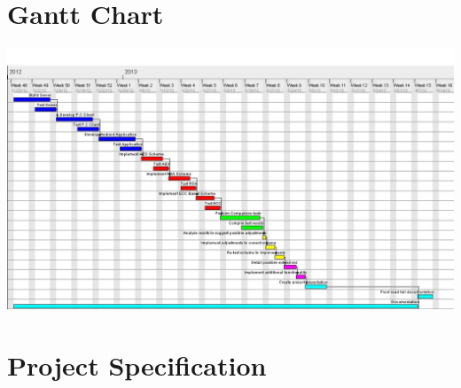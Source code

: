 \documentclass[a4paper,11pt]{article}
\begin{document}
\appendix
\section{Gantt Chart}\label{A}
\includegraphics[scale=0.45, angle=270]{ProgReportChart.jpg}

\section{Project Specification}\label{B}

\newpage


\end{document}
